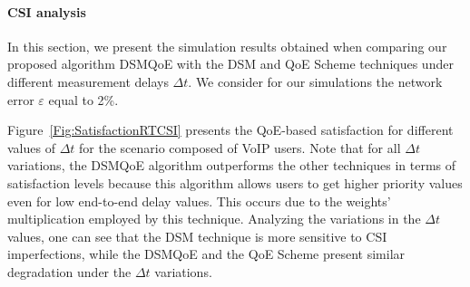 \documentclass[12pt]{article}
\newcommand{\FigRef}[1]{Figure~\ref{#1}}
\begin{document}
%
%
%

\paragraph{\ac{CSI} analysis}
In this section, we present the simulation results obtained when comparing our proposed algorithm DSMQoE with the \ac{DSM} and \ac{QoE} Scheme techniques under different measurement delays $\Delta t$. We consider for our simulations the network error $\varepsilon$ equal to 2\%.

\FigRef{Fig:SatisfactionRTCSI} presents the \ac{QoE}-based satisfaction for different values of $\Delta t$ for the scenario composed of VoIP users. Note that for all $\Delta t$ variations, the DSMQoE algorithm outperforms the other techniques in terms of satisfaction levels because this algorithm allows users to get higher priority values even for low end-to-end delay values. This occurs due to the weights' multiplication employed by this technique. Analyzing the variations in the $\Delta t$ values, one can see that the DSM technique is more sensitive to CSI imperfections, while the DSMQoE and the QoE Scheme present similar degradation under the $\Delta t$ variations.
\end{document}
